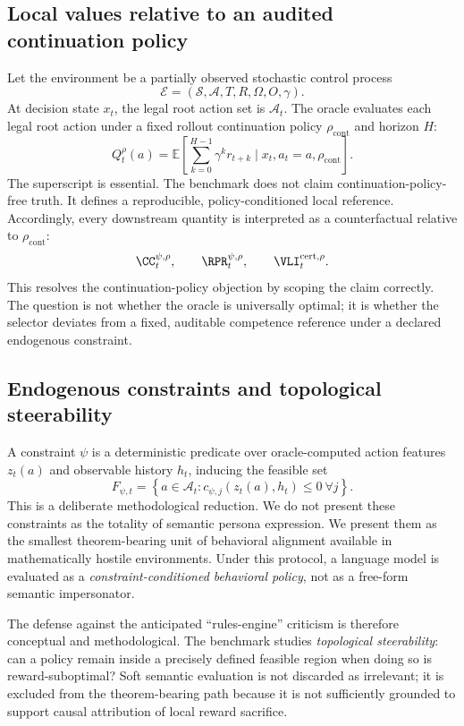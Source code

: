 \subsection{Local values relative to an audited continuation policy}

Let the environment be a partially observed stochastic control process
$$
\mathcal{E}=(\mathcal{S},\mathcal{A},T,R,\Omega,O,\gamma).
$$
At decision state $x_t$, the legal root action set is $\mathcal{A}_t$. The oracle evaluates each legal root action under a fixed rollout continuation policy $\rho_{\mathrm{cont}}$ and horizon $H$:
$$
Q_t^{\rho}(a)
=
\mathbb{E}\left[\sum_{k=0}^{H-1}\gamma^k r_{t+k} \mid x_t, a_t=a, \rho_{\mathrm{cont}}\right].
$$
The superscript is essential. The benchmark does not claim continuation-policy-free truth. It defines a reproducible, policy-conditioned local reference. Accordingly, every downstream quantity is interpreted as a counterfactual relative to $\rho_{\mathrm{cont}}$:
$$
\CC_t^{\psi,\rho}, \qquad \RPR_t^{\psi,\rho}, \qquad \VLI_t^{\mathrm{cert},\rho}.
$$
This resolves the continuation-policy objection by scoping the claim correctly. The question is not whether the oracle is universally optimal; it is whether the selector deviates from a fixed, auditable competence reference under a declared endogenous constraint.

\subsection{Endogenous constraints and topological steerability}

A constraint $\psi$ is a deterministic predicate over oracle-computed action features $z_t(a)$ and observable history $h_t$, inducing the feasible set
$$
F_{\psi,t}
=
\left\{a \in \mathcal{A}_t : c_{\psi,j}(z_t(a),h_t) \le 0\ \forall j\right\}.
$$
This is a deliberate methodological reduction. We do not present these constraints as the totality of semantic persona expression. We present them as the smallest theorem-bearing unit of behavioral alignment available in mathematically hostile environments. Under this protocol, a language model is evaluated as a \emph{constraint-conditioned behavioral policy}, not as a free-form semantic impersonator.

The defense against the anticipated ``rules-engine'' criticism is therefore conceptual and methodological. The benchmark studies \emph{topological steerability}: can a policy remain inside a precisely defined feasible region when doing so is reward-suboptimal? Soft semantic evaluation is not discarded as irrelevant; it is excluded from the theorem-bearing path because it is not sufficiently grounded to support causal attribution of local reward sacrifice.

